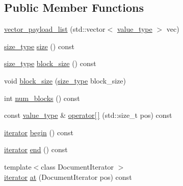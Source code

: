 \subsection*{Public Member Functions}
\begin{DoxyCompactItemize}
\item 
\mbox{\hyperlink{classirk_1_1vector__payload__list_a3d56b520de4d0859f27c3be48fb8067c}{vector\+\_\+payload\+\_\+list}} (std\+::vector$<$ \mbox{\hyperlink{classirk_1_1vector__payload__list_acded07bf18f4c147495e0b0dfdbf8922}{value\+\_\+type}} $>$ vec)
\item 
\mbox{\hyperlink{classirk_1_1vector__payload__list_a319d51342d589c056943998b362120ca}{size\+\_\+type}} \mbox{\hyperlink{classirk_1_1vector__payload__list_ac3adf5af4d6301de780af1a1621a2084}{size}} () const
\item 
\mbox{\hyperlink{classirk_1_1vector__payload__list_a319d51342d589c056943998b362120ca}{size\+\_\+type}} \mbox{\hyperlink{classirk_1_1vector__payload__list_adb75734d3d14e43ff4eaf6fdac2125ff}{block\+\_\+size}} () const
\item 
void \mbox{\hyperlink{classirk_1_1vector__payload__list_a9924676b5747e4785acd933b77158864}{block\+\_\+size}} (\mbox{\hyperlink{classirk_1_1vector__payload__list_a319d51342d589c056943998b362120ca}{size\+\_\+type}} block\+\_\+size)
\item 
int \mbox{\hyperlink{classirk_1_1vector__payload__list_a7b28927adf91d29429f4089a3af41d19}{num\+\_\+blocks}} () const
\item 
const \mbox{\hyperlink{classirk_1_1vector__payload__list_acded07bf18f4c147495e0b0dfdbf8922}{value\+\_\+type}} \& \mbox{\hyperlink{classirk_1_1vector__payload__list_ae7225b27a6d4e7b3f14122c99497ebfa}{operator\mbox{[}$\,$\mbox{]}}} (std\+::size\+\_\+t pos) const
\item 
\mbox{\hyperlink{classirk_1_1vector__payload__list_a33f425e324f556bba403c1700ff9915e}{iterator}} \mbox{\hyperlink{classirk_1_1vector__payload__list_a35357c3fd3a0fb7b0308520b052844bf}{begin}} () const
\item 
\mbox{\hyperlink{classirk_1_1vector__payload__list_a33f425e324f556bba403c1700ff9915e}{iterator}} \mbox{\hyperlink{classirk_1_1vector__payload__list_ae8f6de3134a3fbb22ff3334363c1e583}{end}} () const
\item 
{\footnotesize template$<$class Document\+Iterator $>$ }\\\mbox{\hyperlink{classirk_1_1vector__payload__list_a33f425e324f556bba403c1700ff9915e}{iterator}} \mbox{\hyperlink{classirk_1_1vector__payload__list_a2490b25027ce0e8c2689557d06e910e8}{at}} (Document\+Iterator pos) const
\end{DoxyCompactItemize}


